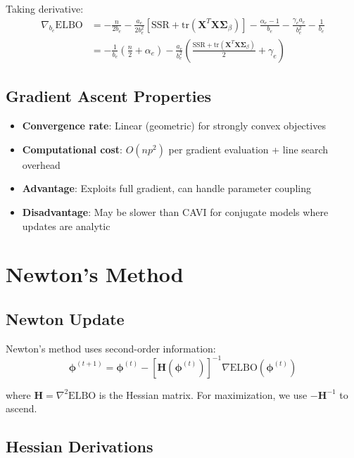 \documentclass[11pt]{article}
\newcommand{\ELBO}{\text{ELBO}}
\newcommand{\tr}{\text{tr}}
\begin{document}
Taking derivative:
\begin{align}
\nabla_{b_e} \ELBO &= -\frac{n}{2b_e} - \frac{a_e}{2b_e^2}\left[\text{SSR} + \tr(\bm{X}^T\bm{X}\bm{\Sigma}_\beta)\right] - \frac{\alpha_e - 1}{b_e} - \frac{\gamma_e a_e}{b_e^2} - \frac{1}{b_e} \nonumber\\
&= -\frac{1}{b_e}\left(\frac{n}{2} + \alpha_e\right) - \frac{a_e}{b_e^2}\left(\frac{\text{SSR} + \tr(\bm{X}^T\bm{X}\bm{\Sigma}_\beta)}{2} + \gamma_e\right)
\label{eq:grad_b}
\end{align}

\subsection{Gradient Ascent Properties}

\begin{itemize}
\item \textbf{Convergence rate}: Linear (geometric) for strongly convex objectives
\item \textbf{Computational cost}: $O(np^2)$ per gradient evaluation + line search overhead
\item \textbf{Advantage}: Exploits full gradient, can handle parameter coupling
\item \textbf{Disadvantage}: May be slower than CAVI for conjugate models where updates are analytic
\end{itemize}

\section{Newton's Method}

\subsection{Newton Update}

Newton's method uses second-order information:
\begin{equation}
\bm{\phi}^{(t+1)} = \bm{\phi}^{(t)} - [\bm{H}(\bm{\phi}^{(t)})]^{-1} \nabla \ELBO(\bm{\phi}^{(t)})
\end{equation}

where $\bm{H} = \nabla^2 \ELBO$ is the Hessian matrix. For maximization, we use $-\bm{H}^{-1}$ to ascend.

\subsection{Hessian Derivations}
\end{document}

